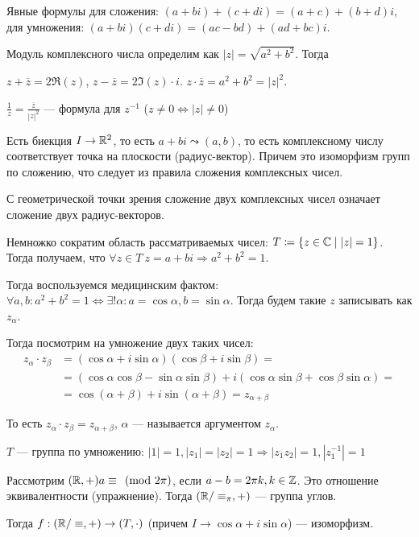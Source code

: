  Явные формулы для сложения: $(a+bi) + (c+di) = (a+c)+(b+d)i$, для умножения:  $(a + bi)(c + di) = (ac - bd) + (ad + bc)i$.

 Модуль комплексного числа определим как $|z| = \sqrt{a^2 + b^2}$. Тогда


 $z + \overline{z} = 2\Re(z)$,  $z - \overline{z} = 2 \Im(z) \cdot i$.  $z \cdot \overline{z} = a^2 + b^2 = |z|^2$.

 $\frac{1}{z} = \frac{\overline{z}}{|z|^2}$ --- формула для $z^{-1}$ ($z \neq 0 \iff |z| \neq 0$)  

Есть биекция $I \to \mathbb{R}^2$, то есть  $a+bi \leadsto (a, b)$, то  есть комплексному числу соответствует точка на плоскости (радиус-вектор). Причем это изоморфизм групп по сложению, что следует из правила сложения комплексных чисел. 

С геометрической точки зрения сложение двух комплексных чисел означает сложение двух радиус-векторов.

Немножко сократим область рассматриваемых чисел: $T \coloneqq \{ z \in \mathbb{C} \mid |z| = 1\}$. Тогда получаем, что  $\forall z \in T\ z=a+bi \Rightarrow a^2+b^2=1$. 

Тогда воспользуемся медицинским фактом:  $\forall a, b\!: a^2 + b^2=1 \iff \exists! \alpha\!: a = \cos \alpha, b = \sin \alpha$. Тогда будем такие $z$ записывать как $z_\alpha$.

Тогда посмотрим на умножение двух таких чисел: \begin{align*}
    z_\alpha\cdot z_\beta &= (\cos \alpha + i\sin \alpha)(\cos \beta + i \sin \beta) =\\
                          &= (\cos \alpha \cos \beta - \sin \alpha \sin \beta) + i(\cos \alpha \sin \beta + \cos \beta \sin \alpha) = \\
                          &= \cos(\alpha + \beta) + i\sin(\alpha + \beta) = z_{\alpha+\beta}
\end{align*}

То есть $z_\alpha \cdot z_\beta = z_{\alpha+\beta}$,  $\alpha$ --- называется аргументом  $z_{\alpha}$. 
 \begin{remark}
     $T$ --- группа по умножению:  $|1| = 1, |z_1|=|z_2|=1 \Rightarrow |z_1z_2| = 1, |z_{1}^{-1}|=1$
\end{remark}
Рассмотрим $(\mathbb{R}, +) a \equiv \pmod{2\pi}$, если  $a-b=2\pi k, k \in \mathbb{Z}$. Это отношение эквивалентности (упражнение). Тогда $(\mathbb{R} / \equiv_\pi, +)$ --- группа углов.

Тогда  $f: (\mathbb{R} / \equiv, +) \to (T, \cdot)$ (причем $I \to \cos \alpha + i \sin \alpha$) --- изоморфизм. 

